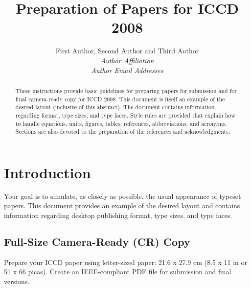 \documentclass[letterpaper, 10 pt, conference]{ieeeconf}  %
\title{\LARGE \bf
Preparation of Papers for ICCD 2008
}
\author{First Author, Second Author and Third Author%
	\\\textit{Author Affiliation}%
	\\\textit{Author Email Addresses}
}
\begin{document}
\maketitle
\thispagestyle{empty}
\pagestyle{empty}


\begin{abstract}

These instructions provide basic guidelines for preparing papers for submission
and for final camera-ready copy for ICCD 2008.  This document is itself an example of the
desired layout (inclusive of this abstract). The document
contains information regarding format, type sizes, and
type faces. Style rules are provided that explain how to handle equations,
units, figures, tables, references, abbreviations, and acronyms. Sections
are also devoted to the preparation of the references and acknowledgments.

\end{abstract}


\section{Introduction}

Your goal is to simulate, as closely as possible, the usual appearance of typeset
 papers. This document provides an example of the desired layout and contains
 information regarding desktop publishing format, type sizes, and type faces.

\subsection{Full-Size Camera-Ready (CR) Copy}

Prepare your ICCD paper using letter-sized paper: 21.6 x 27.9 cm (8.5 x 11 in or 51 x 66 picas).
Create an IEEE-compliant PDF file for submission and final versions.

\addtolength{\textheight}{-3cm}   %
\end{document}
